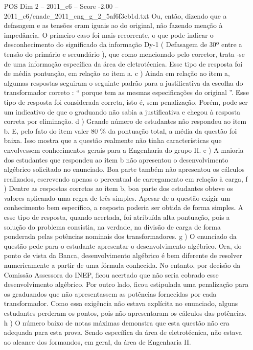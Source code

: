 \begin{textsample}{POS Dim 2 – 2011\_c6 – Score -2.00 – 2011\_c6/enade\_2011\_eng\_g\_2\_5af6f3cb1d.txt}
Ou, então, dizendo que a defasagem e as tensões eram iguais ao do original, não fazendo menção à impedância.
O primeiro caso foi mais recorrente, o que pode indicar o desconhecimento do significado da informação Dy-1 ( Defasagem de 30º entre a tensão do primário e secundário ), que como mencionado pelo corretor, trata -se de uma informação específica da área de eletrotécnica.
Esse tipo de resposta foi de média pontuação, em relação ao item a. c ) Ainda em relação ao item a, algumas respostas seguiram o seguinte padrão para a justificativa da escolha do transformador correto : “ porque tem as mesmas especificações do original ”.
Esse tipo de resposta foi considerada correta, isto é, sem penalização.
Porém, pode ser um indicativo de que o graduando não sabia a justificativa e chegou à resposta correta por eliminação. d ) Grande número de estudantes não respondeu ao item b.
E, pelo fato do item valer 80 \% da pontuação total, a média da questão foi baixa.
Isso mostra que a questão realmente não tinha características que envolvessem conhecimentos gerais para a Engenharia do grupo II. e ) A maioria dos estudantes que respondeu ao item b não apresentou o desenvolvimento algébrico solicitado no enunciado.
Boa parte também não apresentou os cálculos realizados, escrevendo apenas o percentual de carregamento em relação à carga, f ) Dentre as respostas corretas ao item b, boa parte dos estudantes obteve os valores aplicando uma regra de três simples.
Apesar de a questão exigir um conhecimento bem específico, a resposta poderia ser obtida de forma simples.
A esse tipo de resposta, quando acertada, foi atribuída alta pontuação, pois a solução do problema consistia, na verdade, na divisão de carga de forma ponderada pelas potências nominais dos transformadores. g ) O enunciado da questão pede para o estudante apresentar o desenvolvimento algébrico.
Ora, do ponto de vista da Banca, desenvolvimento algébrico é bem diferente de resolver numericamente a partir de uma fórmula conhecida.
No entanto, por decisão da Comissão Assessora do INEP, ficou acertado que não seria cobrado esse desenvolvimento algébrico.
Por outro lado, ficou estipulada uma penalização para os graduandos que não apresentassem as potências fornecidas por cada transformador.
Como essa exigência não estava explícita no enunciado, alguns estudantes perderam os pontos, pois não apresentaram os cálculos das potências. h ) O número baixo de notas máximas demonstra que esta questão não era adequada para esta prova.
Sendo específica da área de eletrotécnica, não estava ao alcance dos formandos, em geral, da área de Engenharia II.

\end{textsample}
